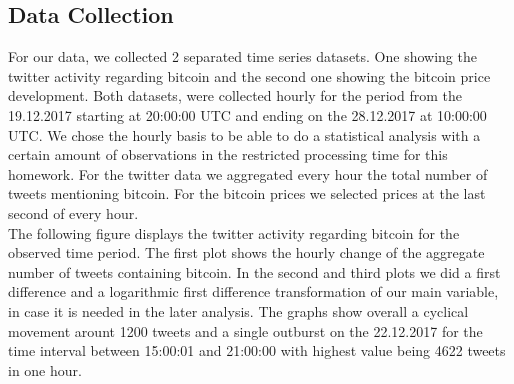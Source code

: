 \documentclass[a4paper,american,12pt]{article}
\begin{document}
\begin{spacing}{1.2}
		
\subsection{Data Collection}
For our data, we collected 2 separated time series datasets. One showing the twitter activity regarding bitcoin and the second one showing the bitcoin price development. Both datasets, were collected hourly for the period from the 19.12.2017 starting at 20:00:00 UTC and ending on the 28.12.2017 at 10:00:00 UTC. We chose the hourly basis to be able to do a statistical analysis with a certain amount of observations in the restricted processing time for this homework. For the twitter data we aggregated every hour the total number of tweets mentioning bitcoin. For the bitcoin prices we selected prices at the last second of every hour.\\
The following figure displays the twitter activity regarding bitcoin for the observed time period. The first plot shows the hourly change of the aggregate number of tweets containing bitcoin. In the second and third plots we did a first difference and a logarithmic first difference transformation of our main variable, in case it is needed in the later analysis. The graphs show overall a cyclical movement arount 1200 tweets and a single outburst on the 22.12.2017 for the time interval between 15:00:01 and 21:00:00 with highest value being 4622 tweets in one hour.\\


\end{spacing}
\end{document}
